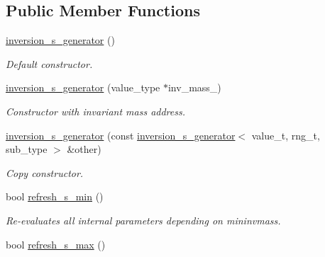 \subsection*{Public Member Functions}
\begin{DoxyCompactItemize}
\item 
\hypertarget{a00317_ab65468b455764d12f944b1b002a55bc5}{\hyperlink{a00317_ab65468b455764d12f944b1b002a55bc5}{inversion\-\_\-s\-\_\-generator} ()}\label{a00317_ab65468b455764d12f944b1b002a55bc5}

\begin{DoxyCompactList}\small\item\em Default constructor. \end{DoxyCompactList}\item 
\hypertarget{a00317_a5095bc02dbb3c29e2a747ad6764ec8f3}{\hyperlink{a00317_a5095bc02dbb3c29e2a747ad6764ec8f3}{inversion\-\_\-s\-\_\-generator} (value\-\_\-type $\ast$inv\-\_\-mass\-\_\-)}\label{a00317_a5095bc02dbb3c29e2a747ad6764ec8f3}

\begin{DoxyCompactList}\small\item\em Constructor with invariant mass address. \end{DoxyCompactList}\item 
\hypertarget{a00317_a79c252ec81b51110ddef4476399a34be}{\hyperlink{a00317_a79c252ec81b51110ddef4476399a34be}{inversion\-\_\-s\-\_\-generator} (const \hyperlink{a00317}{inversion\-\_\-s\-\_\-generator}$<$ value\-\_\-t, rng\-\_\-t, sub\-\_\-type $>$ \&other)}\label{a00317_a79c252ec81b51110ddef4476399a34be}

\begin{DoxyCompactList}\small\item\em Copy constructor. \end{DoxyCompactList}\item 
\hypertarget{a00317_a4174038f562dfa6d50b2e0a595a10486}{bool \hyperlink{a00317_a4174038f562dfa6d50b2e0a595a10486}{refresh\-\_\-s\-\_\-min} ()}\label{a00317_a4174038f562dfa6d50b2e0a595a10486}

\begin{DoxyCompactList}\small\item\em Re-\/evaluates all internal parameters depending on mininvmass. \end{DoxyCompactList}\item 
\hypertarget{a00317_ae92d71747eeb57fb9d3d45dd97ea8fcf}{bool \hyperlink{a00317_ae92d71747eeb57fb9d3d45dd97ea8fcf}{refresh\-\_\-s\-\_\-max} ()}\label{a00317_ae92d71747eeb57fb9d3d45dd97ea8fcf}


\end{DoxyCompactItemize}
